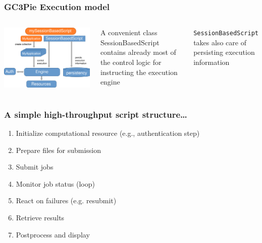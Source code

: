 \documentclass[english,serif,mathserif,xcolor=pdftex,dvipsnames,table]{beamer}
\begin{document}
\begin{frame}
  \frametitle{GC3Pie Execution model}
  \begin{columns}
      \includegraphics[width=1\textwidth]{fig/GC3Pie_execution_model}
  \begin{block}{}
    A convenient class {\color{Blue}SessionBasedScript} contains already
    most of the control logic for instructing the execution engine
  \end{block}

  \begin{block}{}
    \texttt{SessionBasedScript} takes also care of {\color{Blue}persisting}
    execution information
  \end{block}
  \end{columns}
\end{frame}


\begin{frame}
  \frametitle{A simple high-throughput script structure\ldots{}}
  
  \begin{enumerate}
  \item Initialize computational resource (e.g., authentication step)
  \item Prepare files for submission
  \item Submit jobs
  \item Monitor job status (loop)
  \item React on failures (e.g. resubmit)
  \item Retrieve results
  \item Postprocess and display
  \end{enumerate}
\end{frame}
\end{document}
